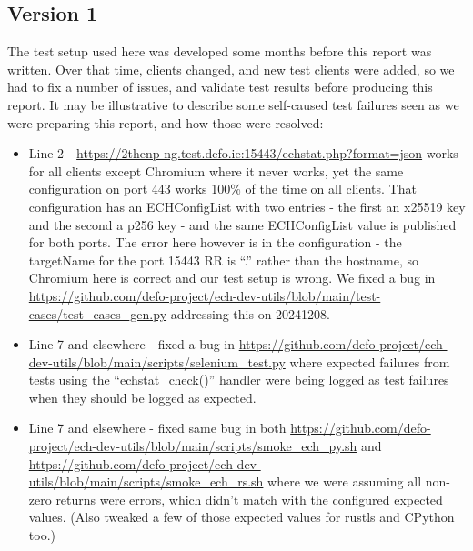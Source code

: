 \subsection{Version 1}

The test setup used here was developed some months before this report was
written.  Over that time, clients changed, and new test clients were added, so
we had to fix a number of issues, and validate test results before producing
this report. It may be illustrative to describe some self-caused test failures
seen as we were preparing this report, and how those were resolved:

\begin{itemize}

\item Line 2 -
    \url{https://2thenp-ng.test.defo.ie:15443/echstat.php?format=json} works
        for all clients except Chromium where it never works, yet the same
        configuration on port 443 works 100\% of the time on all clients. That
        configuration has an ECHConfigList with two entries - the first an
        x25519 key and the second a p256 key - and the same ECHConfigList value
        is published for both ports. The error here however is in the
        configuration - the targetName for the port 15443 RR is ``.'' rather
        than the hostname, so Chromium here is correct and our test setup is
        wrong. We fixed a bug in
        \url{https://github.com/defo-project/ech-dev-utils/blob/main/test-cases/test_cases_gen.py}
        addressing this on 20241208.\\

    \item Line 7 and elsewhere - fixed a bug in
        \url{https://github.com/defo-project/ech-dev-utils/blob/main/scripts/selenium_test.py}
        where expected failures from tests using the ``echstat\_check()''
        handler were being logged as test failures when they should be logged
        as expected.

    \item Line 7 and elsewhere - fixed same bug in both
        \url{https://github.com/defo-project/ech-dev-utils/blob/main/scripts/smoke_ech_py.sh}
        and
        \url{https://github.com/defo-project/ech-dev-utils/blob/main/scripts/smoke_ech_rs.sh}
        where we were assuming all non-zero returns were errors, which didn't match with
        the configured expected values. (Also tweaked a few of those expected values for
        rustls and CPython too.)


\end{itemize}
